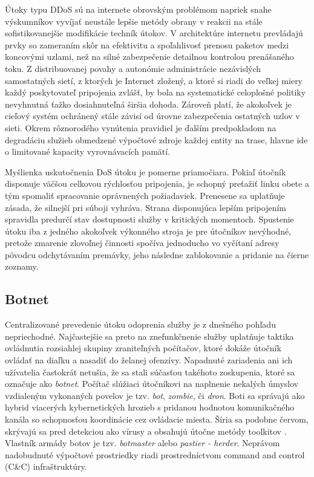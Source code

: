\documentclass[12pt, a4paper]{article}
\begin{document}
Útoky typu DDoS sú na internete obrovským problémom napriek snahe výskumníkov vyvíjať neustále lepšie 
metódy obrany v reakcii na stále sofistikovanejšie modifikácie techník útokov. V architektúre internetu 
prevládajú prvky so zameraním skôr na efektivitu a spoľahlivosť prenosu paketov medzi koncovými uzlami, než 
na silné zabezpečenie detailnou kontrolou prenášaného toku. Z distribuovanej povahy a autonómie 
administrácie nezávislých samostatných sietí, z ktorých je Internet zložený, a ktoré si riadi 
do veľkej miery každý poskytovateľ pripojenia zvlášť, by bola na systematické celoplošné politiky nevyhnutná 
ťažko dosiahnuteľná širšia dohoda. Zároveň platí, že akokoľvek je cieľový systém ochránený stále závisí od 
úrovne zabezpečenia ostatných uzlov v sieti. Okrem rôznorodého vynútenia pravidiel je ďalším predpokladom na 
degradáciu služieb obmedzené výpočtové zdroje každej entity na trase, hlavne ide o limitované kapacity 
vyrovnávacích pamätí.

Myšlienka uskutočnenia DoS útoku je pomerne priamočiara. Pokiaľ útočník disponuje väčšou celkovou rýchlosťou 
pripojenia, je schopný preťažiť linku obete a tým spomaliť spracovanie oprávnených požiadaviek. Prenesene sa 
uplatňuje zásada, že silnejší pri súboji vyhráva. Strana disponujúca lepším pripojením spravidla predurčí 
stav dostupnosti služby v kritických momentoch. Spustenie útoku iba z jedného akokoľvek výkonného stroja
je pre útočníkov nevýhodné, pretože zmarenie zlovoľnej činnosti spočíva jednoducho vo vyčítaní adresy 
pôvodcu odchytávaním premávky, jeho následne zablokovanie a pridanie na čierne zoznamy. 

\subsection{Botnet}
Centralizované prevedenie útoku odoprenia služby je z dnešného pohľadu nepriechodné. Najčastejšie sa preto 
na znefunkčnenie služby uplatňuje taktika ovládnutia rozsiahlej skupiny zraniteľných počítačov, ktoré dokáže 
útočník ovládať na diaľku a nasadiť do želanej ofenzívy. Napadnuté zariadenia ani ich užívatelia 
častokrát netušia, že sa stali súčasťou takéhoto zoskupenia, ktoré sa označuje ako \emph{botnet}. 
Počítač slúžiaci útočníkovi na naplnenie nekalých úmyslov vzdialeným vykonaných povelov je tzv. \emph{bot}, 
\emph{zombie}, či \emph{dron}. Boti sa správajú ako hybrid viacerých kybernetických hrozieb s pridanou 
hodnotou komunikačného  kanála so schopnosťou koordinácie cez ovládacie miesta. Šíria sa podobne červom, 
skrývajú sa pred detekciou ako vírusy a obsahujú útočne metódy toolkitov \cite{zombie-roundup}. Vlastník 
armády botov je tzv. \emph{botmaster} alebo \emph{pastier - herder}. Neprávom nadobudnuté výpočtové 
prostriedky riadi prostredníctvom command and control (C\&C) infraštruktúry.
\end{document}
